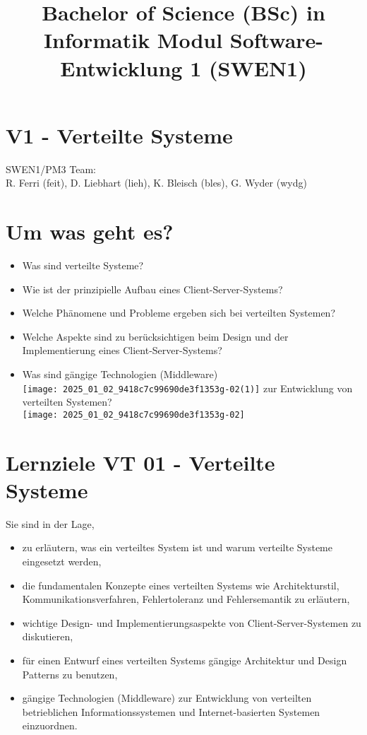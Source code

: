 \documentclass[10pt]{article}
\title{Bachelor of Science (BSc) in Informatik Modul Software-Entwicklung 1 (SWEN1) }
\author{}
\date{}
\begin{document}
\maketitle
\section*{V1 - Verteilte Systeme}
SWEN1/PM3 Team:\\
R. Ferri (feit), D. Liebhart (lieh), K. Bleisch (bles), G. Wyder (wydg)

\section*{Um was geht es?}
\begin{itemize}
  \item Was sind verteilte Systeme?
  \item Wie ist der prinzipielle Aufbau eines Client-Server-Systems?
  \item Welche Phänomene und Probleme ergeben sich bei verteilten Systemen?
  \item Welche Aspekte sind zu berücksichtigen beim Design und der Implementierung eines Client-Server-Systems?
  \item Was sind gängige Technologien (Middleware)\\
\texttt{[image: 2025\_01\_02\_9418c7c99690de3f1353g-02(1)]} zur Entwicklung von verteilten Systemen?\\
\texttt{[image: 2025\_01\_02\_9418c7c99690de3f1353g-02]}
\end{itemize}

\section*{Lernziele VT 01 - Verteilte Systeme}
Sie sind in der Lage,

\begin{itemize}
  \item zu erläutern, was ein verteiltes System ist und warum verteilte Systeme eingesetzt werden,
  \item die fundamentalen Konzepte eines verteilten Systems wie Architekturstil, Kommunikationsverfahren, Fehlertoleranz und Fehlersemantik zu erläutern,
  \item wichtige Design- und Implementierungsaspekte von Client-Server-Systemen zu diskutieren,
  \item für einen Entwurf eines verteilten Systems gängige Architektur und Design Patterns zu benutzen,
  \item gängige Technologien (Middleware) zur Entwicklung von verteilten betrieblichen Informationssystemen und Internet-basierten Systemen einzuordnen.
\end{itemize}
\end{document}
